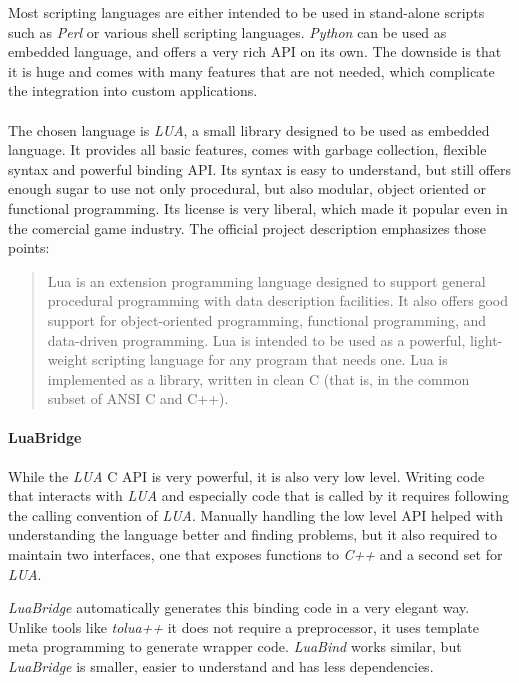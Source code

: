 Most scripting languages are either intended to be used in stand-alone scripts such as \textit{Perl} or various shell scripting languages.
\textit{Python} can be used as  embedded language, and offers a very rich API on its own.
The downside is that it is huge and comes with many features that are not needed, which complicate
the integration into custom applications.

\paragraph{}
The chosen language is \textit{LUA}\cite{lua}, a small library designed to be used as embedded language.
It provides all basic features, comes with garbage collection, flexible syntax and powerful binding API.
Its syntax is easy to understand, but still offers enough sugar to use not only procedural, but also modular, object oriented or functional programming.
Its license is very liberal, which made it popular even in the comercial game industry.
The official project description emphasizes those points:

\begin{quotation}
Lua is an extension programming language designed to support general procedural programming with data description facilities. It also offers good support for object-oriented programming, functional programming, and data-driven programming. Lua is intended to be used as a powerful, light-weight scripting language for any program that needs one. Lua is implemented as a library, written in clean C (that is, in the common subset of ANSI C and C++).
\end{quotation}

\paragraph{LuaBridge}
While the \textit{LUA} C API is very powerful, it is also very low level.
Writing code that interacts with \textit{LUA} and especially code that is called by it requires following the calling convention of \textit{LUA}.
Manually handling the low level API helped with understanding the language better and finding problems,
but it also required to maintain two interfaces, one that exposes functions to \textit{C++} and a second set for \textit{LUA}.

\textit{LuaBridge} automatically generates this binding code in a very elegant way.
Unlike tools like \textit{tolua++} it does not require a preprocessor,
it uses template meta programming to generate wrapper code.
\textit{LuaBind} works similar, but \textit{LuaBridge} is smaller, easier to understand and has less dependencies.

